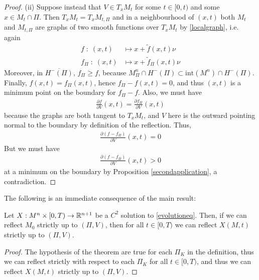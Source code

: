 \begin{proof}
	(ii) Suppose instead that $V\in T_xM_t$  for some $t\in [0, t)$ and some $x\in M_t\cap \Pi$. Then $T_xM_t= T_xM_{t, \Pi}$ and in a neighbourhood of $(x, t)$ both $M_t$ and $M_{t, \Pi}$ are graphs of two smooth functions over $T_xM_t$ by \ref{localgraph}, i.e. again
	\begin{align*}
		f \; : \; (x, t) &\mapsto x+\tilde{f}(x, t)\nu \\
		f_\Pi \; : \; (x, t) &\mapsto x+\tilde{f}_\Pi(x, t)\nu 
	\end{align*} 
	Moreover, in $\overline{H^-(\Pi)}$, $f_\Pi\geq f$, because $M^n_\Pi\cap H^-(\Pi)\subset \mathrm{int}(M^n)\cap H^-(\Pi)$. Finally, $f(x, t)=f_\Pi (x, t)$, hence $f_\Pi-f (x, t)=0$, and thus  $(x, t)$ is a minimum point on the boundary for $f_\Pi-f$. Also, we must have
	\begin{align*}
		\frac{\partial f}{\partial V}(x,t)=\frac{\partial f_\Pi}{\partial V}(x,t)
	\end{align*}
	because the graphs are both tangent to $T_xM_t$, and $V$ here is the outward pointing normal to the boundary by definition of the reflection. Thus, 
	\begin{align*}
		\frac{\partial (f- f_\Pi)}{\partial V}(x,t)=0
	\end{align*}
	But we must have 
	\begin{align*}
		\frac{\partial (f- f_\Pi)}{\partial V}(x,t)>0
	\end{align*}
	at a minimum on the boundary by Proposition \ref{secondapplication}, a contradiction.  
\end{proof}
The following is an immediate consequence of the main result:
\begin{cor}
	Let $X:M^n\times [0,T) \rightarrow \mathbb{R}^{n+1}$ be a $C^2$ solution to \ref{evolutioneq}. Then, if we can reflect $M_0$ strictly up to $(\Pi, V)$, then for all $t\in [0,T)$ we can reflect $X(M, t)$ strictly up to $(\Pi, V)$.  
\end{cor}
\begin{proof}
	The hypothesis of the theorem are true for each $\Pi_K$ in the definition, thus we can reflect strictly with respect to each $\Pi_K$ for all $t\in[0,T)$, and thus we can reflect $X(M, t)$ strictly up to $(\Pi, V)$.
\end{proof}
